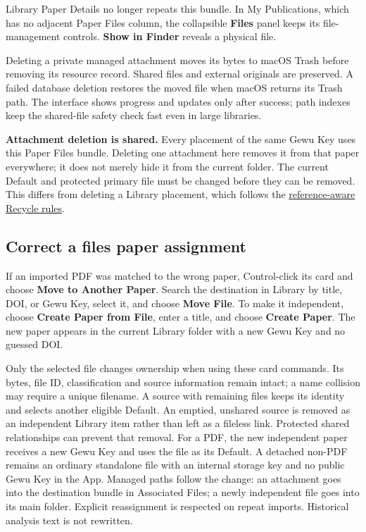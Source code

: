\documentclass[10pt,letterpaper,oneside]{scrreprt}
\begin{document}
Library Paper Details no longer repeats this bundle. In My Publications, which has no adjacent Paper Files column, the collapsible \textbf{Files} panel keeps its file-management controls. \textbf{Show in Finder} reveals a physical file.

Deleting a private managed attachment moves its bytes to macOS Trash before removing its resource record. Shared files and external originals are preserved. A failed database deletion restores the moved file when macOS returns its Trash path. The interface shows progress and updates only after success; path indexes keep the shared-file safety check fast even in large libraries.

\textbf{Attachment deletion is shared.} Every placement of the same Gewu Key uses this Paper Files bundle. Deleting one attachment here removes it from that paper everywhere; it does not merely hide it from the current folder. The current Default and protected primary file must be changed before they can be removed. This differs from deleting a Library placement, which follows the \hyperref[recycle]{reference-aware Recycle rules}.

\subsection{Correct a file\textquotesingle s paper assignment}\label{correct-a-files-paper-assignment}

If an imported PDF was matched to the wrong paper, Control-click its card and choose \textbf{Move to Another Paper}. Search the destination in Library by title, DOI, or Gewu Key, select it, and choose \textbf{Move File}. To make it independent, choose \textbf{Create Paper from File}, enter a title, and choose \textbf{Create Paper}. The new paper appears in the current Library folder with a new Gewu Key and no guessed DOI.

Only the selected file changes ownership when using these card commands. Its bytes, file ID, classification and source information remain intact; a name collision may require a unique filename. A source with remaining files keeps its identity and selects another eligible Default. An emptied, unshared source is removed as an independent Library item rather than left as a fileless link. Protected shared relationships can prevent that removal. For a PDF, the new independent paper receives a new Gewu Key and uses the file as its Default. A detached non-PDF remains an ordinary standalone file with an internal storage key and no public Gewu Key in the App. Managed paths follow the change: an attachment goes into the destination bundle in Associated Files; a newly independent file goes into its main folder. Explicit reassignment is respected on repeat imports. Historical analysis text is not rewritten.
\end{document}
